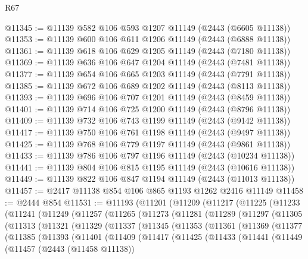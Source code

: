 \begin{lexlean}{R67}
\begin{coremodule}
@11345 := @11139 @582 @106 @593 @1207 @11149 (@2443 (@6605 @11138))
@11353 := @11139 @600 @106 @611 @1206 @11149 (@2443 (@6888 @11138))
@11361 := @11139 @618 @106 @629 @1205 @11149 (@2443 (@7180 @11138))
@11369 := @11139 @636 @106 @647 @1204 @11149 (@2443 (@7481 @11138))
@11377 := @11139 @654 @106 @665 @1203 @11149 (@2443 (@7791 @11138))
@11385 := @11139 @672 @106 @689 @1202 @11149 (@2443 (@8113 @11138))
@11393 := @11139 @696 @106 @707 @1201 @11149 (@2443 (@8459 @11138))
@11401 := @11139 @714 @106 @725 @1200 @11149 (@2443 (@8796 @11138))
@11409 := @11139 @732 @106 @743 @1199 @11149 (@2443 (@9142 @11138))
@11417 := @11139 @750 @106 @761 @1198 @11149 (@2443 (@9497 @11138))
@11425 := @11139 @768 @106 @779 @1197 @11149 (@2443 (@9861 @11138))
@11433 := @11139 @786 @106 @797 @1196 @11149 (@2443 (@10234 @11138))
@11441 := @11139 @804 @106 @815 @1195 @11149 (@2443 (@10616 @11138))
@11449 := @11139 @822 @106 @847 @1194 @11149 (@2443 (@11013 @11138))
@11457 := @2417 @11138 @854 @106 @865 @1193 @1262 @2416 @11149
@11458 := @2444 @854
@11531 := @11193
    (@11201
      (@11209
        (@11217
          (@11225
            (@11233
              (@11241
                (@11249
                  (@11257
                    (@11265
                      (@11273
                        (@11281
                          (@11289
                            (@11297
                              (@11305
                                (@11313
                                  (@11321
                                    (@11329
                                      (@11337
                                        (@11345
                                          (@11353
                                            (@11361
                                              (@11369
                                                (@11377
                                                  (@11385
                                                    (@11393
                                                      (@11401
                                                        (@11409
                                                          (@11417
                                                            (@11425
                                                              (@11433
                                                                (@11441
                                                                  (@11449
                                                                    (@11457
                                                                      (@2443 (@11458 @11138))

\end{coremodule}
\end{lexlean}

